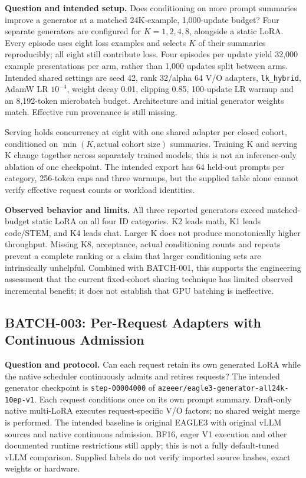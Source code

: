 \textbf{Question and intended setup.} Does conditioning on more prompt summaries
improve a generator at a matched 24K-example, 1,000-update budget? Four separate
generators are configured for $K=1,2,4,8$, alongside a static LoRA. Every episode
uses eight loss examples and selects $K$ of their summaries reproducibly;
all eight still contribute loss. Four episodes per update yield 32,000 example
presentations per arm, rather than 1,000 updates split between arms. Intended
shared settings are seed 42, rank 32/alpha 64 V/O adapters, \texttt{lk\_hybrid},
AdamW LR $10^{-4}$, weight decay 0.01, clipping 0.85, 100-update LR warmup and an
8,192-token microbatch budget. Architecture and initial generator weights match.
Effective run provenance is still missing.



Serving holds concurrency at eight with one shared adapter per closed cohort,
conditioned on $\min(K,\text{actual cohort size})$ summaries. Training K and
serving K change together across separately trained models; this is not an
inference-only ablation of one checkpoint. The intended export has 64 held-out
prompts per category, 256-token caps and three warmups, but the supplied table
alone cannot verify effective request counts or workload identities.

\textbf{Observed behavior and limits.} All three reported generators exceed
matched-budget static LoRA on all four ID categories. K2 leads math, K1 leads
code/STEM, and K4 leads chat. Larger K does not produce monotonically higher
throughput. Missing K8, acceptance, actual conditioning counts and repeats
prevent a complete ranking or a claim that larger conditioning sets are
intrinsically unhelpful. Combined with BATCH-001, this supports the engineering
assessment that the current fixed-cohort sharing technique has limited observed
incremental benefit; it does not establish that GPU batching is ineffective.

\subsection{BATCH-003: Per-Request Adapters with Continuous Admission}

\textbf{Question and protocol.} Can each request retain its own generated LoRA
while the native scheduler continuously admits and retires requests? The intended
generator checkpoint is \texttt{step-00004000} of
\texttt{azeeer/eagle3-generator-all24k-10ep-v1}. Each request conditions once on
its own prompt summary. Draft-only native multi-LoRA executes request-specific
V/O factors; no shared weight merge is performed. The intended baseline is
original EAGLE3 with original vLLM sources and native continuous admission.
BF16, eager V1 execution and other documented runtime restrictions still apply;
this is not a fully default-tuned vLLM comparison. Supplied labels do not verify
imported source hashes, exact weights or hardware.

